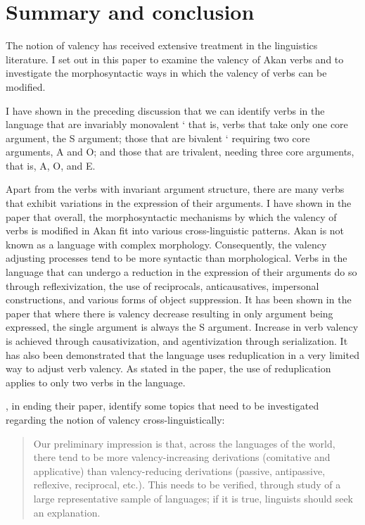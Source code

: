 \documentclass[output=paper]{langsci/langscibook}
\begin{document}
\section{Summary and conclusion}\label{§7:summary.osam}

The notion of valency has received extensive treatment in the linguistics literature. I set out in this paper to examine the valency of Akan verbs and to investigate the morphosyntactic ways in which the valency of verbs can be modified. 

I have shown in the preceding discussion that we can identify verbs in the language that are invariably monovalent ` that is, verbs that take only one core argument, the S argument; those that are bivalent ` requiring two core arguments, A and O; and those that are trivalent, needing three core arguments, that is, A, O, and E.

Apart from the verbs with invariant argument structure, there are many verbs that exhibit variations in the expression of their arguments. I have shown in the paper that overall, the morphosyntactic mechanisms by which the valency of verbs is modified in Akan fit into various cross-linguistic patterns. Akan is not known as a language with complex morphology. Consequently, the valency adjusting processes tend to be more syntactic than morphological. Verbs in the language that can undergo a reduction in the expression of their arguments do so through reflexivization, the use of reciprocals, anticausatives, impersonal constructions, and various forms of object suppression. It has been shown in the paper that where there is valency decrease resulting in only argument being expressed, the single argument is always the S argument.  Increase in verb valency is achieved through causativization, and agentivization through serialization. It has also been demonstrated that the language uses reduplication in a very limited way to adjust verb valency. As stated in the paper, the use of reduplication applies to only two verbs in the language.

\citet[25-27]{dixonaikhenvald2000b}, in ending their paper, identify some topics that need to be investigated regarding the notion of valency cross-linguistically:

\begin{quote}
Our preliminary impression is that, across the languages of the world, there tend to be more valency-increasing derivations (comitative and applicative) than valency-reducing derivations (passive, antipassive, reflexive, reciprocal, etc.). This needs to be verified, through study of a large representative sample of languages; if it is true, linguists should seek an explanation. \citep[26]{dixonaikhenvald2000b}  
\end{quote}
\end{document}
